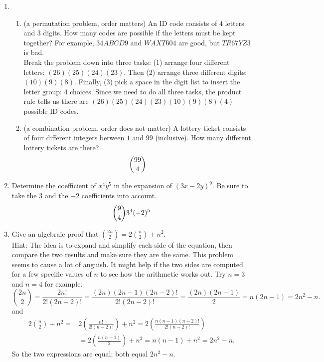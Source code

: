 \documentclass[11pt]{amsart}
\begin{document}
\begin{enumerate}


\item 
\begin{enumerate}
\item (a permutation problem, order matters) An ID code consists of $4$  letters and $3$  digits. How many codes are possible if the letters must be kept together? For example, $34ABCD9$
and $WAXT604$ are good, but $TR67YZ3$ is bad.\\[3pt]
{\color{blue}
Break the problem down into three tasks:
(1) arrange four different letters: $(26)(25)(24)(23)$.
Then (2) arrange three different digits: $(10)(9)(8)$.
Finally, (3) pick a space in the digit list to insert
the letter group: $4$ choices. Since we need to do all
three tasks, the product rule tells us there are
$(26)(25)(24)(23)(10)(9)(8)(4)$ possible ID codes.\\[5pt]
}
\item (a combination problem, order does not matter) A lottery ticket consists of four different integers between $1$ and $99$ (inclusive). How many different lottery tickets are there?\\[3pt]
{\color{blue}
\[ 
\binom{99}{4}\\[5pt]
\]
}


\end{enumerate}

\item Determine the coefficient of  $x^4y^5$ in the expansion of $(3x-2y)^9$. Be sure to 
take the $3$ and the $-2$ coefficients into account.\\[3pt]
{\color{blue}
\[
\binom{9}{4}3^{4}(-2)^{5}\\[5pt]
\]
}


\item    Give an algebraic proof that $\displaystyle {{2n}\choose 2} = 2{n\choose 2} + n^2$.\\[3pt]
Hint: The idea is to expand and simplify each side of the equation, then compare the two results and make sure they are the same. This problem seems to cause a lot of anguish. It might help if the two sides are computed for a few specific values of $n$ to see how the arithmetic works out. Try $n = 3$ and $n=4$ for example.\\[3pt]
{\color{blue}
\[
\binom{2n}{2} = \frac{2n!}{2!(2n-2)!} = \frac{(2n)(2n-1) (2n-2)!}{2!(2n-2)!} = \frac{(2n)(2n-1)}{2} = n(2n-1) = 2n^{2} - n.
\]
and
\begin{align*}
 2\binom{n}{2} + n^2 = & 2\left(\frac{n!}{2!(n-2)!}\right)+ n^{2} = 2\left(\frac{n(n-1)(n-2)!}{2!(n-2)!}\right)\\[3pt]
& = 2\left(\frac{n(n-1)}{2}\right) + n^{2} = n(n-1) + n^{2} = 2n^{2}-n.
\end{align*}
So the two expressions are equal; both equal $2n^{2}-n$.
\\[5pt]
}


\end{enumerate}
\end{document}

